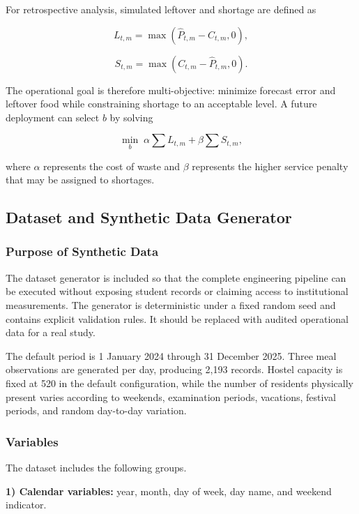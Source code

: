\documentclass[conference]{IEEEtran}
\begin{document}
For retrospective analysis, simulated leftover and shortage are defined
as

\[
L_{t,m}=\max(\hat{P}_{t,m}-C_{t,m},0),
\]

\[
S_{t,m}=\max(C_{t,m}-\hat{P}_{t,m},0).
\]

The operational goal is therefore multi-objective: minimize forecast
error and leftover food while constraining shortage to an acceptable
level. A future deployment can select \(b\) by solving

\[
\min_b \; \alpha\sum L_{t,m}+\beta\sum S_{t,m},
\]

where \(\alpha\) represents the cost of waste and \(\beta\) represents
the higher service penalty that may be assigned to shortages.

\subsection{Dataset and Synthetic Data
Generator}\label{dataset-and-synthetic-data-generator}

\subsubsection{Purpose of Synthetic
Data}\label{purpose-of-synthetic-data}

The dataset generator is included so that the complete engineering
pipeline can be executed without exposing student records or claiming
access to institutional measurements. The generator is deterministic
under a fixed random seed and contains explicit validation rules. It
should be replaced with audited operational data for a real study.

The default period is 1 January 2024 through 31 December 2025. Three
meal observations are generated per day, producing 2,193 records. Hostel
capacity is fixed at 520 in the default configuration, while the number
of residents physically present varies according to weekends,
examination periods, vacations, festival periods, and random day-to-day
variation.

\subsubsection{Variables}\label{variables}

The dataset includes the following groups.

\textbf{1) Calendar variables:} year, month, day of week, day name, and
weekend indicator.
\end{document}
